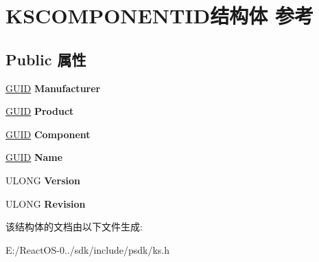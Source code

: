 \hypertarget{struct_k_s_c_o_m_p_o_n_e_n_t_i_d}{}\section{K\+S\+C\+O\+M\+P\+O\+N\+E\+N\+T\+I\+D结构体 参考}
\label{struct_k_s_c_o_m_p_o_n_e_n_t_i_d}
\subsection*{Public 属性}
\begin{DoxyCompactItemize}
\item 
\mbox{\label{struct_k_s_c_o_m_p_o_n_e_n_t_i_d_a59a872f7cd6f61dfcacf8e31727fab51}} 
\hyperlink{interface_g_u_i_d}{G\+U\+ID} {\bfseries Manufacturer}
\item 
\mbox{\label{struct_k_s_c_o_m_p_o_n_e_n_t_i_d_a253cb1a45b797697c3ceb0cba32caed5}} 
\hyperlink{interface_g_u_i_d}{G\+U\+ID} {\bfseries Product}
\item 
\mbox{\label{struct_k_s_c_o_m_p_o_n_e_n_t_i_d_a0b70af11c8775107a245cff47de4c3e1}} 
\hyperlink{interface_g_u_i_d}{G\+U\+ID} {\bfseries Component}
\item 
\mbox{\label{struct_k_s_c_o_m_p_o_n_e_n_t_i_d_a39abe357adffa248232be0dc90a474ab}} 
\hyperlink{interface_g_u_i_d}{G\+U\+ID} {\bfseries Name}
\item 
\mbox{\label{struct_k_s_c_o_m_p_o_n_e_n_t_i_d_aaf6b16bb74b0789b8c332dcefcac6885}} 
U\+L\+O\+NG {\bfseries Version}
\item 
\mbox{\label{struct_k_s_c_o_m_p_o_n_e_n_t_i_d_a75509b7781b2ad620ce927112a26970d}} 
U\+L\+O\+NG {\bfseries Revision}
\end{DoxyCompactItemize}


该结构体的文档由以下文件生成\+:\begin{DoxyCompactItemize}
\item 
E\+:/\+React\+O\+S-\/0../sdk/include/psdk/ks.\+h\end{DoxyCompactItemize}
